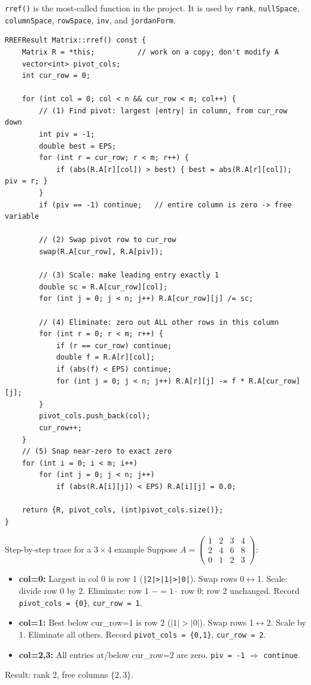 \documentclass[12pt, a4paper]{article}
\newcommand{\code}[1]{\texttt{\small#1}}
\newcommand{\fn}[1]{\texttt{\small\color{funcgreen}#1}}
\begin{document}
\code{rref()} is the most-called function in the project.  It is used by
\fn{rank}, \fn{nullSpace}, \fn{columnSpace}, \fn{rowSpace}, \fn{inv}, and
\fn{jordanForm}.

\begin{lstlisting}
RREFResult Matrix::rref() const {
    Matrix R = *this;          // work on a copy; don't modify A
    vector<int> pivot_cols;
    int cur_row = 0;

    for (int col = 0; col < n && cur_row < m; col++) {
        // (1) Find pivot: largest |entry| in column, from cur_row down
        int piv = -1;
        double best = EPS;
        for (int r = cur_row; r < m; r++) {
            if (abs(R.A[r][col]) > best) { best = abs(R.A[r][col]); piv = r; }
        }
        if (piv == -1) continue;   // entire column is zero -> free variable

        // (2) Swap pivot row to cur_row
        swap(R.A[cur_row], R.A[piv]);

        // (3) Scale: make leading entry exactly 1
        double sc = R.A[cur_row][col];
        for (int j = 0; j < n; j++) R.A[cur_row][j] /= sc;

        // (4) Eliminate: zero out ALL other rows in this column
        for (int r = 0; r < m; r++) {
            if (r == cur_row) continue;
            double f = R.A[r][col];
            if (abs(f) < EPS) continue;
            for (int j = 0; j < n; j++) R.A[r][j] -= f * R.A[cur_row][j];
        }
        pivot_cols.push_back(col);
        cur_row++;
    }
    // (5) Snap near-zero to exact zero
    for (int i = 0; i < m; i++)
        for (int j = 0; j < n; j++)
            if (abs(R.A[i][j]) < EPS) R.A[i][j] = 0.0;

    return {R, pivot_cols, (int)pivot_cols.size()};
}
\end{lstlisting}

\begin{notebox}{Step-by-step trace for a $3\times4$ example}
Suppose $A = \begin{pmatrix}1&2&3&4\\2&4&6&8\\0&1&2&3\end{pmatrix}$:
\begin{itemize}[noitemsep]
  \item \textbf{col=0:} Largest in col 0 is row 1 (\code{|2|>|1|>|0|}).
        Swap rows 0$\leftrightarrow$1. Scale: divide row 0 by 2.
        Eliminate: row 1 $-= 1 \cdot$ row 0; row 2 unchanged.
        Record \code{pivot\_cols = \{0\}}, \code{cur\_row = 1}.
  \item \textbf{col=1:} Best below cur\_row=1 is row 2 ($|1| > |0|$).
        Swap rows 1$\leftrightarrow$2. Scale by 1. Eliminate all others.
        Record \code{pivot\_cols = \{0,1\}}, \code{cur\_row = 2}.
  \item \textbf{col=2,3:} All entries at/below cur\_row=2 are zero.
        \code{piv = -1} $\Rightarrow$ \code{continue}.
\end{itemize}
Result: rank 2, free columns $\{2,3\}$.
\end{notebox}
\end{document}
